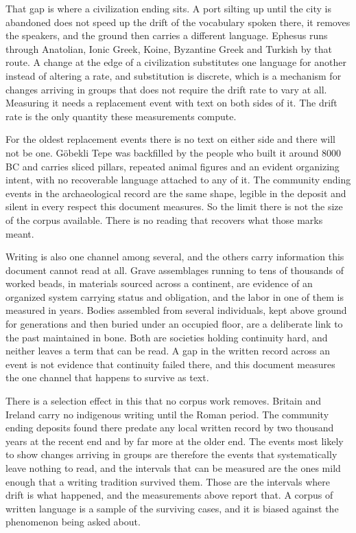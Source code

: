 That gap is where a civilization ending sits. A port silting up until the city is abandoned does not speed up the drift of the vocabulary spoken there, it removes the speakers, and the ground then carries a different language. Ephesus runs through Anatolian, Ionic Greek, Koine, Byzantine Greek and Turkish by that route. A change at the edge of a civilization substitutes one language for another instead of altering a rate, and substitution is discrete, which is a mechanism for changes arriving in groups that does not require the drift rate to vary at all. Measuring it needs a replacement event with text on both sides of it. The drift rate is the only quantity these measurements compute.

For the oldest replacement events there is no text on either side and there will not be one. Göbekli Tepe was backfilled by the people who built it around 8000 BC and carries sliced pillars, repeated animal figures and an evident organizing intent, with no recoverable language attached to any of it. The community ending events in the archaeological record are the same shape, legible in the deposit and silent in every respect this document measures. So the limit there is not the size of the corpus available. There is no reading that recovers what those marks meant.

Writing is also one channel among several, and the others carry information this document cannot read at all. Grave assemblages running to tens of thousands of worked beads, in materials sourced across a continent, are evidence of an organized system carrying status and obligation, and the labor in one of them is measured in years. Bodies assembled from several individuals, kept above ground for generations and then buried under an occupied floor, are a deliberate link to the past maintained in bone. Both are societies holding continuity hard, and neither leaves a term that can be read. A gap in the written record across an event is not evidence that continuity failed there, and this document measures the one channel that happens to survive as text.

There is a selection effect in this that no corpus work removes. Britain and Ireland carry no indigenous writing until the Roman period. The community ending deposits found there predate any local written record by two thousand years at the recent end and by far more at the older end. The events most likely to show changes arriving in groups are therefore the events that systematically leave nothing to read, and the intervals that can be measured are the ones mild enough that a writing tradition survived them. Those are the intervals where drift is what happened, and the measurements above report that. A corpus of written language is a sample of the surviving cases, and it is biased against the phenomenon being asked about.

